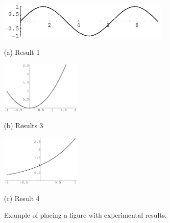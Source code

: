 \begin{figure}[htb]

\begin{minipage}[b]{1.0\linewidth}
  \centering
  \centerline{\includegraphics[width=8.5cm]{images/image1}}
  \centerline{(a) Result 1}\medskip
\end{minipage}
%
\begin{minipage}[b]{.48\linewidth}
  \centering
  \centerline{\includegraphics[width=4.0cm]{images/image3}}
  \centerline{(b) Results 3}\medskip
\end{minipage}
\hfill
\begin{minipage}[b]{0.48\linewidth}
  \centering
  \centerline{\includegraphics[width=4.0cm]{images/image4}}
  \centerline{(c) Result 4}\medskip
\end{minipage}
%
\caption{Example of placing a figure with experimental results.}
\label{fig:res}
%
\end{figure}



